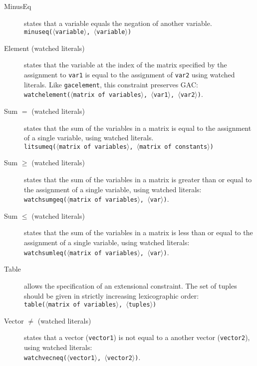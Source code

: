 \documentclass{article}
\begin{document}
\begin{small}
\begin{description}
\item[MinusEq] states that a variable equals the negation of another variable.
\\
\texttt{minuseq($\langle$variable$\rangle$, $\langle$variable$\rangle$)}

\item[Element (watched literals)] states that the variable at the index of the matrix
specified by the assignment to \texttt{var1} is equal to the
assignment of \texttt{var2} using watched literals.  Like \texttt{gacelement}, this constraint preserves GAC:\\ 
\texttt{watchelement($\langle$matrix of
variables$\rangle$, $\langle$var1$\rangle$, $\langle$var2$\rangle$)}.

\item[Sum $\mathbf{=}$ (watched literals)] states that the sum of the variables in a
matrix is equal to the assignment of a single variable, using watched literals. \\
\texttt{litsumeq($\langle$matrix of variables$\rangle$, $\langle$matrix of constants$\rangle$)}


\item[Sum $\mathbf{\geq}$ (watched literals)] states that the sum of the variables in a
matrix is greater than or equal to the assignment of a single
variable, using watched literals:\\ \texttt{watchsumgeq($\langle$matrix of variables$\rangle$,
$\langle$var$\rangle$)}.

\item[Sum $\mathbf{\leq}$ (watched literals)] states that the sum of the variables in a
matrix is less than or equal to the assignment of a single variable, using watched literals:\\
\texttt{watchsumleq($\langle$matrix of variables$\rangle$,
$\langle$var$\rangle$)}.

\item[Table] allows the specification of an extensional constraint. The
set of tuples should be given in strictly increasing lexicographic order:\\
\texttt{table($\langle$matrix of variables$\rangle$, $\langle$tuples$\rangle$)}

\item[Vector $ \mathbf{\neq}$ (watched literals)] states that a vector (\texttt{vector1}) is not
equal to a another vector (\texttt{vector2}), using watched literals:\\
\texttt{watchvecneq($\langle$vector1$\rangle$, $\langle$vector2$\rangle$)}.



\end{description}
\end{small}
\end{document}
